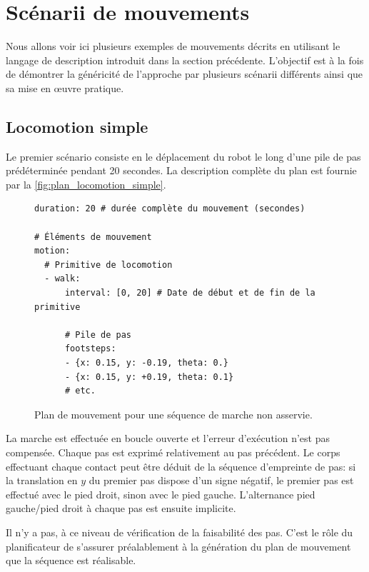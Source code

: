 \section{Scénarii de mouvements}


Nous allons voir ici plusieurs exemples de mouvements décrits en
utilisant le langage de description introduit dans la section
précédente. L'objectif est à la fois de démontrer la généricité de
l'approche par plusieurs scénarii différents ainsi que sa mise en
\oe uvre pratique.


\subsection{Locomotion simple}

Le premier scénario consiste en le déplacement du robot le long d'une
pile de pas prédéterminée pendant 20 secondes. La description
complète du plan est fournie par la \autoref{fig:plan_locomotion_simple}.

\begin{figure}
  \begin{center}
\begin{verbatim}
duration: 20 # durée complète du mouvement (secondes)

# Éléments de mouvement
motion:
  # Primitive de locomotion
  - walk:
      interval: [0, 20] # Date de début et de fin de la primitive

      # Pile de pas
      footsteps:
      - {x: 0.15, y: -0.19, theta: 0.}
      - {x: 0.15, y: +0.19, theta: 0.1}
      # etc.
\end{verbatim}
  \end{center}
  \caption{Plan de mouvement pour une séquence de marche non asservie.\label{fig:plan_locomotion_simple}}
\end{figure}

La marche est effectuée en boucle ouverte et l'erreur d'exécution
n'est pas compensée. Chaque pas est exprimé relativement au pas
précédent. Le corps effectuant chaque contact peut être déduit de la
séquence d'empreinte de pas: si la translation en $y$ du premier pas
dispose d'un signe négatif, le premier pas est effectué avec le pied
droit, sinon avec le pied gauche. L'alternance pied gauche/pied droit
à chaque pas est ensuite implicite.


Il n'y a pas, à ce niveau de vérification de la faisabilité des
pas. C'est le rôle du planificateur de s'assurer préalablement à la
génération du plan de mouvement que la séquence est réalisable.

